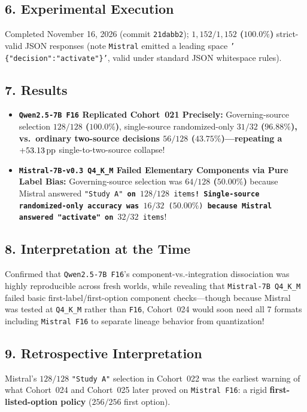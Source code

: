 \subsection*{6. Experimental Execution}
Completed November 16, 2026 (commit \texttt{21dabb2}); \textbf{$1{,}152/1{,}152$ ($100.0\%$)} strict-valid JSON responses (note \texttt{Mistral} emitted a leading space \texttt{' \{"decision":"activate"\}'}, valid under standard JSON whitespace rules).

\subsection*{7. Results}
\begin{itemize}
  \item \textbf{\texttt{Qwen2.5-7B F16} Replicated Cohort~021 Precisely:} Governing-source selection \textbf{$128/128$ ($100.0\%$)}, single-source randomized-only \textbf{$31/32$ ($96.88\%$)\textbf{, vs.\ ordinary two-source decisions }$56/128$ ($43.75\%$)\textbf{---repeating a }$+53.13\,\mathrm{pp}$} single-to-two-source collapse!
  \item \textbf{\texttt{Mistral-7B-v0.3 Q4\_K\_M} Failed Elementary Components via Pure Label Bias:} Governing-source selection was \textbf{$64/128$ ($50.00\%$)} because Mistral answered \texttt{"Study A"\textbf{ on }$128/128$ items\textbf{! Single-source randomized-only accuracy was }$16/32$ ($50.00\%$)\textbf{ because Mistral answered \texttt{"activate"} on }$32/32$ items}!
\end{itemize}

\subsection*{8. Interpretation at the Time}
Confirmed that \texttt{Qwen2.5-7B F16}'s component-vs.-integration dissociation was highly reproducible across fresh worlds, while revealing that \texttt{Mistral-7B Q4\_K\_M} failed basic first-label/first-option component checks---though because Mistral was tested at \texttt{Q4\_K\_M} rather than \texttt{F16}, Cohort~024 would soon need all 7 formats including \texttt{Mistral F16} to separate lineage behavior from quantization!

\subsection*{9. Retrospective Interpretation}
Mistral's $128/128$ \texttt{"Study A"} selection in Cohort~022 was the earliest warning of what Cohort~024 and Cohort~025 later proved on \texttt{Mistral F16}: a rigid \textbf{first-listed-option policy} ($256/256$ first option).

